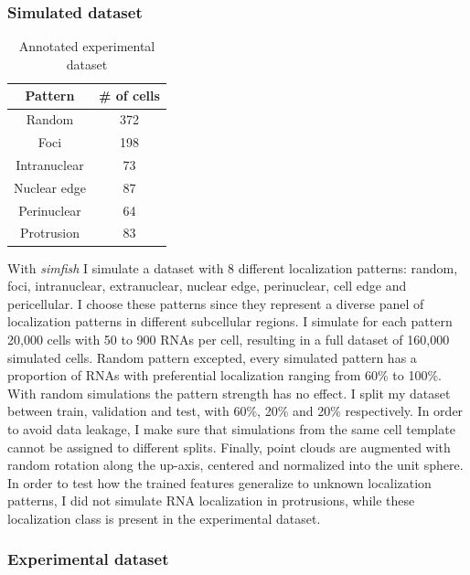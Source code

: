 \subsubsection{Simulated dataset}

\begin{table}
	\centering
	\begin{tabular}{| c | c |}
		\hline
		Pattern & \# of cells \\
		\hline
		Random & 372\\
		Foci & 198\\
		Intranuclear & 73\\
		Nuclear edge & 87\\
		Perinuclear & 64\\
		Protrusion & 83\\
		\hline
	\end{tabular}
	\caption[Annotated experimental dataset for RNA localization patterns]{Annotated experimental dataset}
	\label{table:real_dataset}
\end{table}

With \emph{simfish} I simulate a dataset with 8 different localization patterns: random, foci, intranuclear, extranuclear, nuclear edge, perinuclear, cell edge and pericellular.
I choose these patterns since they represent a diverse panel of localization patterns in different subcellular regions.
I simulate for each pattern 20,000 cells with 50 to 900 \ac{RNA}s per cell, resulting in a full dataset of 160,000 simulated cells.
Random pattern excepted, every simulated pattern has a proportion of \ac{RNA}s with preferential localization ranging from 60\% to 100\%.
With random simulations the pattern strength has no effect.
I split my dataset between train, validation and test, with 60\%, 20\% and 20\% respectively.
In order to avoid data leakage, I make sure that simulations from the same cell template cannot be assigned to different splits.
Finally, point clouds are augmented with random rotation along the up-axis, centered and normalized into the unit sphere.
In order to test how the trained features generalize to unknown localization patterns, I did not simulate \ac{RNA} localization in protrusions, while these localization class is present in the experimental dataset.

\subsubsection{Experimental dataset}

